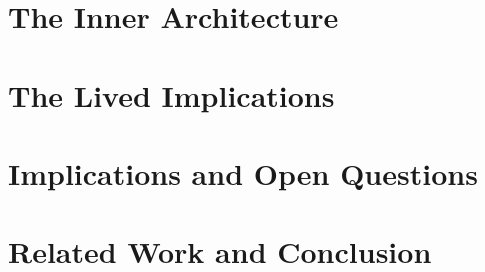 \documentclass{article}
\begin{document}
\part{The Inner Architecture}




\part{The Lived Implications}



\part{Implications and Open Questions}




\part{Related Work and Conclusion}



\appendix








\clearpage
{}
\nocite{*}


\end{document}
